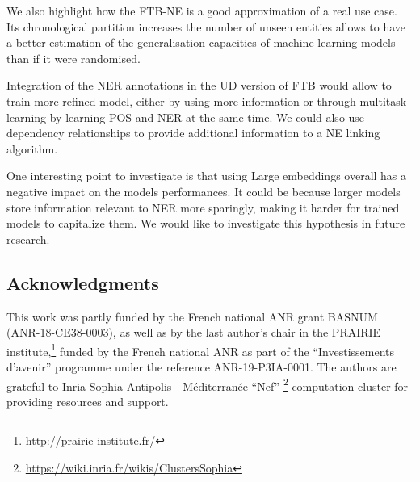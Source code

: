 We also highlight how the FTB-NE is a good approximation of a real use case. Its chronological partition increases the number of unseen entities allows to have a better estimation of the generalisation capacities of machine learning models than if it were randomised.

Integration of the NER annotations in the UD version of FTB would allow to train more refined model, either by using more information or through multitask learning by learning POS and NER at the same time. We could also use dependency relationships to provide additional information to a NE linking algorithm.

One interesting point to investigate is that using Large embeddings overall has a negative impact on the models performances. It could be because larger models store information relevant to NER more sparingly, making it harder for trained models to capitalize them. We would like to investigate this hypothesis in future research.



\subsection*{Acknowledgments}

This work was partly funded by the French national ANR grant BASNUM (\mbox{ANR-18-CE38-0003}), as well as by the last author's chair in the PRAIRIE institute,\footnote{\url{http://prairie-institute.fr/}} funded by the French national ANR as part of the ``Investissements d’avenir'' programme under the reference \mbox{ANR-19-P3IA-0001}. The authors are grateful to Inria Sophia Antipolis - Méditerranée ``Nef'' \footnote{\url{https://wiki.inria.fr/wikis/ClustersSophia}} computation cluster for providing resources and support.